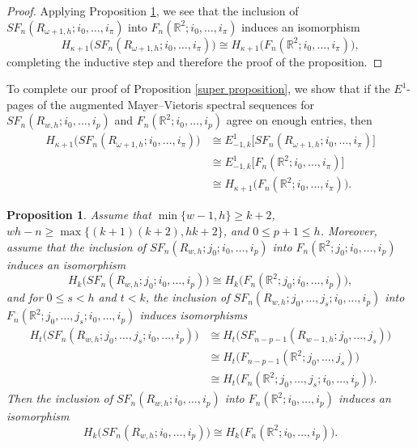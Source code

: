 \documentclass[pagebackref,colorlinks,citecolor=blue,linkcolor=blue,urlcolor=blue,filecolor=blue]{article}
\newtheorem{prop}[thm]{Proposition}
\theoremstyle{definition}\newtheorem{definition}[thm]{Definition}
\theoremstyle{definition}
\newcommand{\R}{\ensuremath{\mathbb{R}}}
\begin{document}
\begin{proof}
Applying Proposition \ref{higher terms in spectral sequence}, we see that the inclusion of $SF_{n}(R_{\omega+1, h}; i_{0}, \dots, i_{\pi})$ into $F_{n}(\R^{2}; i_{0}, \dots, i_{\pi})$ induces an isomorphism
\[
H_{\kappa+1}\big(SF_{n}(R_{\omega+1, h}; i_{0}, \dots, i_{\pi})\big)\cong H_{\kappa+1}\big(F_{n}(\R^{2}; i_{0}, \dots, i_{\pi})\big),
\]
completing the inductive step and therefore the proof of the proposition.
\end{proof}

To complete our proof of Proposition \ref{super proposition}, we show that if the $E^{1}$-pages of the augmented Mayer--Vietoris spectral sequences for $SF_{n}(R_{w,h}; i_{0}, \dots, i_{p})$ and $F_{n}(\R^{2}; i_{0}, \dots, i_{p})$ agree on enough entries, then
\begin{align*}
H_{\kappa+1}\big(SF_{n}(R_{\omega+1, h}; i_{0}, \dots, i_{\pi})\big)&\cong E^{1}_{-1, k}\big[SF_{n}(R_{\omega+1, h}; i_{0}, \dots, i_{\pi})\big]\\&\cong E^{1}_{-1, k}\big[F_{n}(\R^{2}; i_{0}, \dots, i_{\pi})\big]\\&\cong H_{\kappa+1}\big(F_{n}(\R^{2}; i_{0}, \dots, i_{\pi})\big).
\end{align*}

\begin{prop}\label{higher terms in spectral sequence}
Assume that $\min\{w-1, h\}\ge k+2$, $wh-n\ge \max\big\{(k+1)(k+2), hk+2\big\}$, and $0\le p+1\le h$.
Moreover, assume that the inclusion of $SF_{n}(R_{w,h}; j_{0}; i_{0}, \dots, i_{p})$ into $F_{n}(\R^{2}; j_{0}; i_{0}, \dots, i_{p})$
induces an isomorphism
\[
H_{k}\big(SF_{n}(R_{w,h}; j_{0}; i_{0}, \dots, i_{p})\big)\cong H_{k}\big(F_{n}(\R^{2}; j_{0}; i_{0}, \dots, i_{p})\big), 
\]
and for $0\le s<h$ and $t<k$, the inclusion of $SF_{n}(R_{w,h}; j_{0}, \dots, j_{s}; i_{0}, \dots, i_{p})$ into $F_{n}(\R^{2}; j_{0}, \dots, j_{s}; i_{0}, \dots, i_{p})$ induces isomorphisms
\begin{align*}
H_{t}\big(SF_{n}(R_{w,h}; j_{0}, \dots, j_{s}; i_{0}, \dots, i_{p})\big)&\cong H_{t}\big(SF_{n-p-1}(R_{w-1,h}; j_{0}, \dots, j_{s})\big)\\&\cong H_{t}\big(F_{n-p-1}(\R^{2}; j_{0}, \dots, j_{s})\big)\\&\cong H_{t}\big(F_{n}(\R^{2}; j_{0}, \dots, j_{s}; i_{0}, \dots, i_{p})\big).
\end{align*}
Then the inclusion of $SF_{n}(R_{w,h}; i_{0}, \dots, i_{p})$ into $F_{n}(\R^{2};  i_{0}, \dots, i_{p})$ induces an isomorphism
\[
H_{k}\big(SF_{n}(R_{w,h}; i_{0}, \dots, i_{p})\big)\cong H_{k}\big(F_{n}(\R^{2}; i_{0}, \dots, i_{p})\big).
\]
\end{prop}
\end{document}
